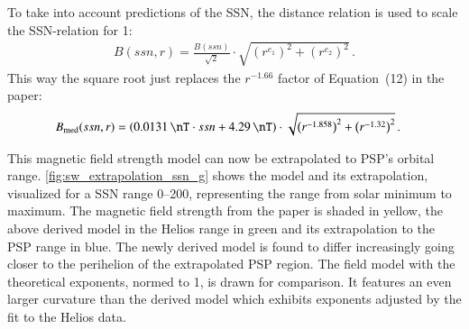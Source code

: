 To take into account predictions of the SSN, the distance relation is used to scale the SSN-relation for \SI{1}{\au}:
\begin{align}
	B(ssn,r) = \frac{B(ssn)}{\sqrt{2}} \cdot \sqrt{\left(r^{e_1}\right)^2 + \left(r^{e_2}\right)^2}	\,.
\end{align}
This way the square root just replaces the $r^{-1.66}$ factor of Equation~(12) in the paper:
\begin{align}
	B_\text{med}(ssn,r) &= \left(\SI{0.0131}{\nT} \cdot ssn + \SI{4.29}{\nT}\right) \cdot \sqrt{\left(r^{-1.858}\right)^2 + \left(r^{-1.32}\right)^2}	\,.
\end{align}

This magnetic field strength model can now be extrapolated to PSP's orbital range. \autoref{fig:sw_extrapolation_ssn_g} shows the model and its extrapolation, visualized for a SSN range \numrange{0}{200}, representing the range from solar minimum to maximum. The magnetic field strength from the paper is shaded in yellow, the above derived model in the Helios range in green and its extrapolation to the PSP range in blue. The newly derived model is found to differ increasingly going closer to the perihelion of the extrapolated PSP region. The \citet{Parker1958} field model with the theoretical exponents, normed to \SI{1}{\au}, is drawn for comparison. It features an even larger curvature than the derived model which exhibits exponents adjusted by the fit to the Helios data.
\begin{figure}[htb]
\end{figure}

